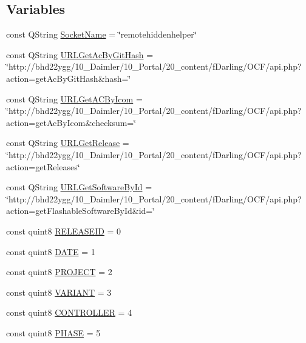 \subsection*{Variables}
\begin{DoxyCompactItemize}
\item 
const Q\+String \hyperlink{namespace_r_w_1_1_c_o_r_e_adaaf185681c4c91a7d72836e233b6088}{Socket\+Name} = \char`\"{}remotehiddenhelper\char`\"{}
\item 
const Q\+String \hyperlink{namespace_r_w_1_1_c_o_r_e_affb7fb47b505558e4dfa32d94e2d4e91}{U\+R\+L\+Get\+Ac\+By\+Git\+Hash} = \char`\"{}http\+://bhd22ygg/10\+\_\+\+Daimler/10\+\_\+\+Portal/20\+\_\+content/f\+Darling/\+O\+C\+F/api.\+php?action=get\+Ac\+By\+Git\+Hash\&hash=\char`\"{}
\item 
const Q\+String \hyperlink{namespace_r_w_1_1_c_o_r_e_a604f5c85b6be2343ea0db0705d133142}{U\+R\+L\+Get\+A\+C\+By\+Icom} = \char`\"{}http\+://bhd22ygg/10\+\_\+\+Daimler/10\+\_\+\+Portal/20\+\_\+content/f\+Darling/\+O\+C\+F/api.\+php?action=get\+Ac\+By\+Icom\&checksum=\char`\"{}
\item 
const Q\+String \hyperlink{namespace_r_w_1_1_c_o_r_e_ab79694a797ed6cedf35b6ce3768c1500}{U\+R\+L\+Get\+Release} = \char`\"{}http\+://bhd22ygg/10\+\_\+\+Daimler/10\+\_\+\+Portal/20\+\_\+content/f\+Darling/\+O\+C\+F/api.\+php?action=get\+Releases\char`\"{}
\item 
const Q\+String \hyperlink{namespace_r_w_1_1_c_o_r_e_acb2b7235cefee05dcfb0b11fb9b120f0}{U\+R\+L\+Get\+Software\+By\+Id} = \char`\"{}http\+://bhd22ygg/10\+\_\+\+Daimler/10\+\_\+\+Portal/20\+\_\+content/f\+Darling/\+O\+C\+F/api.\+php?action=get\+Flashable\+Software\+By\+Id\&id=\char`\"{}
\item 
const quint8 \hyperlink{namespace_r_w_1_1_c_o_r_e_a2fe4b6c0a4a833ba0dfc0ea6429250be}{R\+E\+L\+E\+A\+S\+E\+ID} = 0
\item 
const quint8 \hyperlink{namespace_r_w_1_1_c_o_r_e_ab143b8adddb28680256b515f6faa4cd1}{D\+A\+TE} = 1
\item 
const quint8 \hyperlink{namespace_r_w_1_1_c_o_r_e_a8dcc285eebd3f8b770ebb99805098b20}{P\+R\+O\+J\+E\+CT} = 2
\item 
const quint8 \hyperlink{namespace_r_w_1_1_c_o_r_e_ab54780bf174013fa9c8a2b1bdcdfbaef}{V\+A\+R\+I\+A\+NT} = 3
\item 
const quint8 \hyperlink{namespace_r_w_1_1_c_o_r_e_aeeadafd77ab6ae9024c8721a39e2c6d7}{C\+O\+N\+T\+R\+O\+L\+L\+ER} = 4
\item 
const quint8 \hyperlink{namespace_r_w_1_1_c_o_r_e_a20b9fbc004429b5ebfbee5c5ef385068}{P\+H\+A\+SE} = 5
\end{DoxyCompactItemize}


